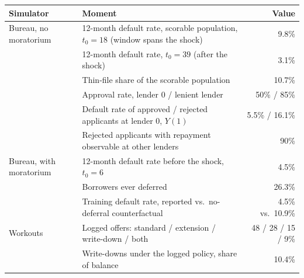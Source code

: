 \begin{tabular}{llr}
\toprule
Simulator & Moment & Value \\
\midrule
Bureau, no moratorium & 12-month default rate, scorable population, $t_0=18$ (window spans the shock) & 9.8\% \\
 & 12-month default rate, $t_0=39$ (after the shock) & 3.1\% \\
 & Thin-file share of the scorable population & 10.7\% \\
 & Approval rate, lender 0 / lenient lender & 50\% / 85\% \\
 & Default rate of approved / rejected applicants at lender 0, $Y(1)$ & 5.5\% / 16.1\% \\
 & Rejected applicants with repayment observable at other lenders & 90\% \\
\midrule
Bureau, with moratorium & 12-month default rate before the shock, $t_0=6$ & 4.5\% \\
 & Borrowers ever deferred & 26.3\% \\
 & Training default rate, reported vs.\ no-deferral counterfactual & 4.5\% vs.\ 10.9\% \\
\midrule
Workouts & Logged offers: standard / extension / write-down / both & 48 / 28 / 15 / 9\% \\
 & Write-downs under the logged policy, share of balance & 10.4\% \\
\bottomrule
\end{tabular}
